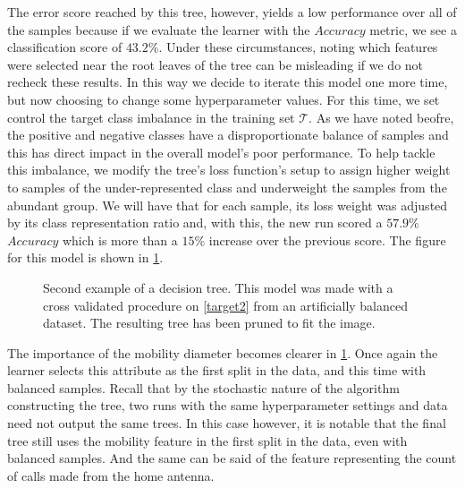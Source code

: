 The error score reached by this tree, however, yields a low performance over all of the samples because if we evaluate the learner with the $Accuracy$ metric, we see a classification score of $43.2\%$.
Under these circumstances, noting which features were selected near the root leaves of the tree can be misleading if we do not recheck these results.
In this way we decide to iterate this model one more time, but now choosing to change some hyperparameter values.
For this time, we set control the target class imbalance in the training set $\mathcal{T}$.
As we have noted beofre, the positive and negative classes have a disproportionate balance of samples and this has direct impact in the overall model's poor performance.
To help tackle this imbalance, we modify the tree's loss function's setup to assign higher weight to samples of the under-represented class and underweight the samples from the abundant group.
We will have that for each sample, its loss weight was adjusted by its class representation ratio and, with this, the new run scored a $57.9\%$ $Accuracy$  which is more than a $15\%$ increase over the previous score.
The figure for this model is shown in \cref{fig:decision_tree_actual_problem2}.


\clearpage

\begin{figure}
    \centering
    \caption{ Second example of a decision tree.
        This model was made with a cross validated procedure on \cref{target2} from an artificially balanced dataset.
        The resulting tree has been pruned to fit the image.}
    \label{fig:decision_tree_actual_problem2}
\end{figure}



The importance of the mobility diameter becomes clearer in \cref{fig:decision_tree_actual_problem2}.
Once again the learner selects this attribute as the first split in the data, and this time with balanced samples.
Recall that by the stochastic nature of the algorithm constructing the tree, two runs with the same hyperparameter settings and data need not output the same trees.
In this case however, it is notable that the final tree still uses the mobility feature in the first split in the data, even with balanced samples.
And the same can be said of the feature representing the count of calls made from the home antenna.

